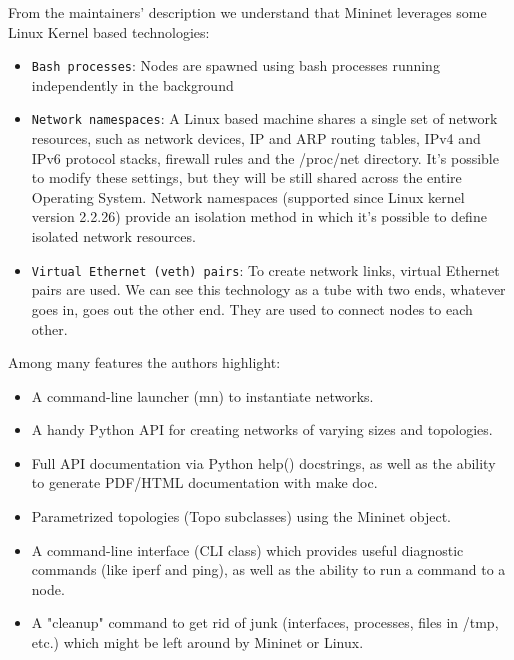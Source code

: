 \documentclass[a4paper,10pt]{memoir}
\begin{document}
From the maintainers' description we understand that Mininet leverages some Linux Kernel based technologies:
\begin{itemize}
    \item\texttt{Bash processes}: Nodes are spawned using bash processes running independently in the background
    \item\texttt{Network namespaces}: A Linux based machine shares a single set of network resources, such as network devices, IP and ARP routing tables, IPv4 and IPv6 protocol stacks, firewall rules and the /proc/net directory. It's possible to modify these settings, but they will be still shared across the entire Operating System. Network namespaces (supported since Linux kernel version 2.2.26) provide an isolation method in which it's possible to define isolated network resources.
    \item\texttt{Virtual Ethernet (veth) pairs}: To create network links, virtual Ethernet pairs are used. We can see this technology as a tube with two ends, whatever goes in, goes out the other end. They are used to connect nodes to each other.
\end{itemize}

Among many features the authors highlight:
\begin{itemize}
    \item A command-line launcher (mn) to instantiate networks.
    \item A handy Python API for creating networks of varying sizes and topologies.
    \item Full API documentation via Python help() docstrings, as well as the ability to generate PDF/HTML documentation with make doc.
    \item Parametrized topologies (Topo subclasses) using the Mininet object.
    \item A command-line interface (CLI class) which provides useful diagnostic commands (like iperf and ping), as well as the ability to run a command to a node.
    \item A "cleanup" command to get rid of junk (interfaces, processes, files in /tmp, etc.) which might be left around by Mininet or Linux.
\end{itemize}
\end{document}
